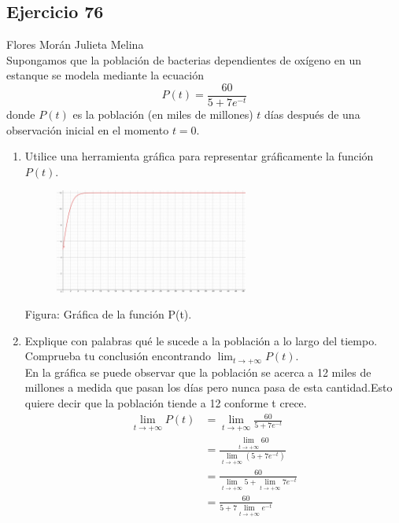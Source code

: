 \documentclass[12pt]{article}
\begin{document}
\subsection{Ejercicio 76} Flores Morán Julieta Melina \\

Supongamos que la población de bacterias dependientes de oxígeno en un estanque se modela mediante la ecuación
\[
P(t)=\frac{60}{5+7e^{-t}}
\]
donde $P(t)$ es la población (en miles de millones) $t$ días después de una observación inicial en el momento $t = 0$.
\begin{enumerate}
\item Utilice una herramienta gráfica para representar gráficamente la función $P(t)$.
  \begin{figure}[H]
\centering
\includegraphics[width=0.6\textwidth]{../img/img_Lista3/poblacionT.png}
  \end{figure}
 Figura: Gráfica de la función P(t).
\item Explique con palabras qué le sucede a la población a lo largo del tiempo. Comprueba tu conclusión encontrando $\lim_{t \to +\infty} P(t)$.\\
  En la gráfica se puede observar que la población se acerca a 12 miles de millones a medida que pasan los días pero nunca pasa de esta cantidad.Esto quiere decir que la población tiende a 12 conforme t crece.\\


\[ \begin{equation*}
  \begin{split}
    \lim_{t \to +\infty} P(t)
    &= \lim_{t \to +\infty} \frac{60}{5+7e^{-t}} \\
    &= \frac{ \lim_{t \to +\infty} 60}{ \lim_{t \to +\infty} (5+7e^{-t})} \\
    &= \frac{ 60}{ \lim_{t \to +\infty}5+  \lim_{t \to +\infty} 7e^{-t}} \\
   & =  \frac{ 60}{ 5+ 7  \lim_{t \to +\infty} e^{-t}}
 \end{split}
\end{equation*} \]
  

\end{enumerate}
\end{document}
